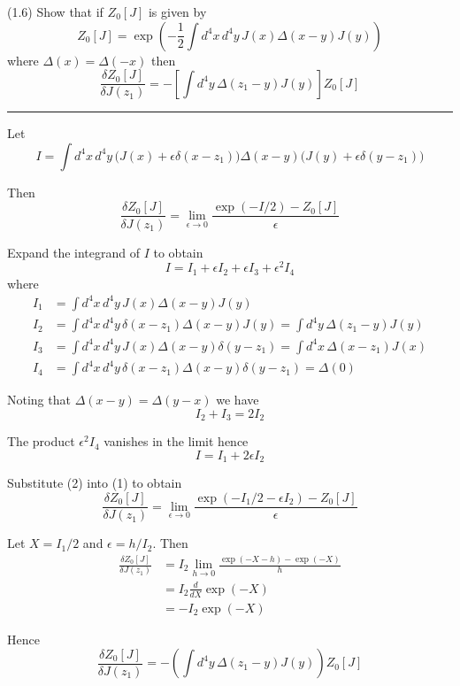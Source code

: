 \documentclass[12pt]{article}
\begin{document}
(1.6)
Show that if $Z_0[J]$ is given by
\begin{equation*}
Z_0[J]=\exp\left(
-\frac{1}{2}\int d^4x\,d^4y\,J(x)\Delta(x-y)J(y)
\right)
\tag{1.49}
\end{equation*}
where $\Delta(x)=\Delta(-x)$ then
\begin{equation*}
\frac{\delta Z_0[J]}{\delta J(z_1)}
=-\left[
\int d^4y\,\Delta(z_1-y)J(y)
\right]Z_0[J]
\tag{1.50}
\end{equation*}

\bigskip
\hrule

\bigskip
Let
\begin{equation*}
I=\int d^4x\,d^4y\,
\big(J(x)+\epsilon\delta(x-z_1)\big)
\Delta(x-y)
\big(J(y)+\epsilon\delta(y-z_1)\big)
\end{equation*}

Then
\begin{equation*}
\frac{\delta Z_0[J]}{\delta J(z_1)}=\lim_{\epsilon\rightarrow0}
\frac{\exp(-I/2)-Z_0[J]}{\epsilon}
\tag{1}
\end{equation*}

Expand the integrand of $I$ to obtain
\begin{equation*}
I=I_1+\epsilon I_2+\epsilon I_3+\epsilon^2 I_4
\end{equation*}
where
\begin{align*}
I_1&=\int d^4x\,d^4y\,J(x)\Delta(x-y)J(y)
\\
I_2&=\int d^4x\,d^4y\,\delta(x-z_1)\Delta(x-y)J(y)=\int d^4y\,\Delta(z_1-y)J(y)
\\
I_3&=\int d^4x\,d^4y\,J(x)\Delta(x-y)\delta(y-z_1)=\int d^4x\,\Delta(x-z_1)J(x)
\\
I_4&=\int d^4x\,d^4y\,\delta(x-z_1)\Delta(x-y)\delta(y-z_1)=\Delta(0)
\end{align*}

Noting that $\Delta(x-y)=\Delta(y-x)$ we have
\begin{equation*}
I_2+I_3=2I_2
\end{equation*}

The product $\epsilon^2I_4$ vanishes in the limit hence
\begin{equation*}
I=I_1+2\epsilon I_2
\tag{2}
\end{equation*}

Substitute (2) into (1) to obtain
\begin{equation*}
\frac{\delta Z_0[J]}{\delta J(z_1)}=\lim_{\epsilon\rightarrow0}
\frac{\exp(-I_1/2-\epsilon I_2)-Z_0[J]}{\epsilon}
\end{equation*}

Let $X=I_1/2$ and $\epsilon=h/I_2$.
Then
\begin{align*}
\frac{\delta Z_0[J]}{\delta J(z_1)}
&=I_2\lim_{h\rightarrow0}\frac{\exp(-X-h)-\exp(-X)}{h}
\\
&=I_2\frac{d}{dX}\exp(-X)
\\
&=-I_2\exp(-X)
\end{align*}

Hence
\begin{equation*}
\frac{\delta Z_0[J]}{\delta J(z_1)}=-\left(\int d^4y\,\Delta(z_1-y)J(y)\right)Z_0[J]
\end{equation*}
\end{document}
